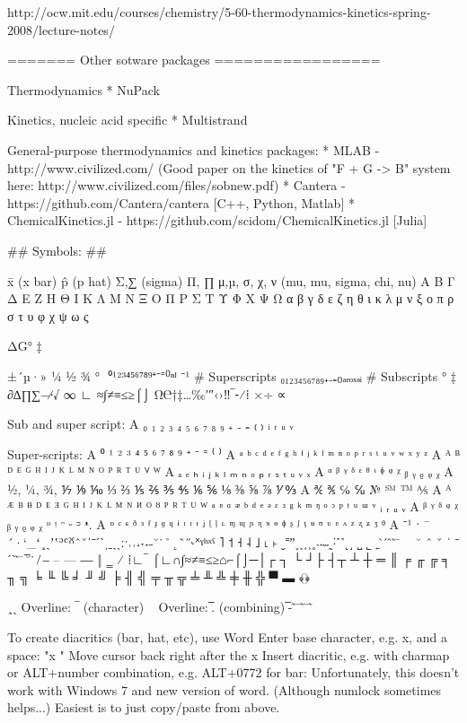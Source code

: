 http://ocw.mit.edu/courses/chemistry/5-60-thermodynamics-kinetics-spring-2008/lecture-notes/




======= Other sotware packages =================


Thermodynamics
* NuPack


Kinetics, nucleic acid specific
* Multistrand

General-purpose thermodynamics and kinetics packages:
* MLAB - http://www.civilized.com/ (Good paper on the kinetics of "F + G -> B" system here: http://www.civilized.com/files/sobnew.pdf)
* Cantera - https://github.com/Cantera/cantera   [C++, Python, Matlab]
* ChemicalKinetics.jl - https://github.com/scidom/ChemicalKinetics.jl  [Julia]



## Symbols: ##

    x̄  (x bar)
    p̂  (p hat)
    Σ,∑  (sigma)
    Π, ∏
    μ,µ, σ, χ, ν (mu, mu, sigma, chi, nu)
    Α Β Γ Δ Ε Ζ Η Θ Ι Κ Λ Μ Ν Ξ Ο Π Ρ Σ Τ Υ Φ Χ Ψ Ω
    α β γ δ ε ζ η θ ι κ λ μ ν ξ ο π ρ σ τ υ φ χ ψ ω ς

    ΔG°
    ‡

    ±´µ·» ¼ ½ ¾ ° ­
    ⁰¹²³⁴⁵⁶⁷⁸⁹⁺⁻⁼⁽⁾ⁿⁱ  ⁻¹       # Superscripts
    ₀₁₂₃₄₅₆₇₈₉₊₋₌₍₎ₐₑₒₓₔᵢ       # Subscripts
    ° ‡
    ∂∆∏∑−∕∙√ ∞ ∟ ≈∫≠≡≤≥⌠⌡
    Ω℮†‡…‰′″‹›‼‾⁃⁄⁞
    ×÷ ∝

    Sub and super script:
    A ₀ ₁ ₂ ₃ ₄ ₅ ₆ ₇ ₈ ₉ ₊ ₋ ₌ ₍ ₎ ᵢ ᵣ ᵤ ᵥ

    Super-scripts:
    A ⁰ ¹ ² ³ ⁴ ⁵ ⁶ ⁷ ⁸ ⁹ ⁺ ⁻ ⁼ ⁽ ⁾
    A ᵃ ᵇ ᶜ ᵈ ᵉ ᶠ ᵍ ʰ ⁱ ʲ ᵏ ˡ ᵐ ⁿ ᵒ ᵖ ʳ ˢ ᵗ ᵘ ᵛ ʷ ˣ ʸ ᶻ
    A ᴬ ᴮ ᴰ ᴱ ᴳ ᴴ ᴵ ᴶ ᴷ ᴸ ᴹ ᴺ ᴼ ᴾ ᴿ ᵀ ᵁ ⱽ ᵂ
    A ₐ ₑ ₕ ᵢ ⱼ ₖ ₗ ₘ ₙ ₒ ₚ ᵣ ₛ ₜ ᵤ ᵥ ₓ
    A ᵅ ᵝ ᵞ ᵟ ᵋ ᶿ ᶥ ᶲ ᵠ ᵡ ᵦ ᵧ ᵨ ᵩ ᵪ
    A ½, ¼, ¾, ⅐ ⅑ ⅒ ⅓ ⅔ ⅕ ⅖ ⅗ ⅘ ⅙ ⅚ ⅛ ⅜ ⅝ ⅞ ⅟ ↉
    A ℀ ℁ ℅ ℆ № ℠ ™ ⅍
    A ᴬ ᴭ ᴮ ᴯ ᴰ ᴱ ᴲ ᴳ ᴴ ᴵ ᴶ ᴷ ᴸ ᴹ ᴺ ᴻ ᴼ ᴽ ᴾ ᴿ ᵀ ᵁ ᵂ ᵃ ᵄ ᵅ ᵆ ᵇ ᵈ ᵉ ᵊ ᵋ ᵌ ᵍ ᵏ ᵐ ᵑ ᵒ ᵓ ᵖ ᵗ ᵘ ᵚ ᵛ ᵢ ᵣ ᵤ ᵥ
    A ᵝ ᵞ ᵟ ᵠ ᵡ ᵦ ᵧ ᵨ ᵩ ᵪ ᵸ ᵎ ᵔ ᵕ ᵙ ᵜ.
    A ᶛ ᶜ ᶝ ᶞ ᶟ ᶠ ᶡ ᶢ ᶣ ᶤ ᶥ ᶦ ᶧ ᶨ ᶩ ᶪ ᶫ ᶬ ᶭ ᶮ ᶯ ᶰ ᶱ ᶲ ᶳ ᶴ ᶵ ᶶ ᶷ ᶸ ᶹ ᶺ ᶻ ᶼ ᶽ ᶾ ᶿ
    A ⁻¹
 ˑ
    ¯´·`_ʻ¸ˎʼʽʾʿˀˁˆˇˈˉˊˋˌˍˎˏːˑ˒˓˔˕˖˗˘˙˚˛˜˝˞˟ˠˡˢˣˤ ˥ ˦ ˧ ˨ ˩ ˪ ˫ ˬ˭ˮ˯˰˱˲˳˴˵˶˷˸˹˺˻˼ ˽ ˾ ˿ ̀  ́ ̂ ̃ ̄
    ~ ˘ ˆ ˇ  ˈ ˉ ˊˋ ̃ ̄  ̅  ̆  ̇
    ̸
    ‒ – — ―  ‖ ‗
    ⁄ ⁞∟‾ ⌠∟∩∫≈≠≡≤≥⌂⌐⌠⌡─│┌ ┐ └ ┘├ ┤┬ ┴ ┼ ═ ║ ╒ ╓ ╔ ╕ ╖ ╗ ╘ ╙ ╚ ╛ ╜ ╝ ╞ ╢ ╣ ╤ ╥ ╦ ╧ ╨ ╩ ╪ ╫ ╬  ▀ ▬ ﴾﴿

        ¸ˎ
        Overline: ‾  (character)  ~
        Overline: ̅.  (combining)  ̅-  ̃ ̄  ̃  ̄   ̃


To create diacritics (bar, hat, etc), use Word
    Enter base character, e.g. x, and a space: "x "
    Move cursor back right after the x
    Insert diacritic, e.g. with charmap or ALT+number combination, e.g. ALT+0772 for bar:
    Unfortunately, this doesn't work with Windows 7 and new version of word.
    (Although numlock sometimes helps...)
    Easiest is to just copy/paste from above.

